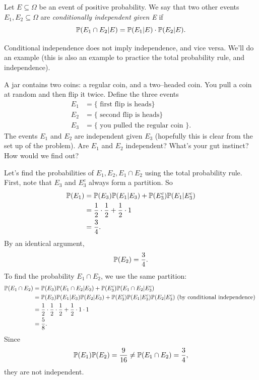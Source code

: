 \documentclass{ximera}
\begin{document}
\begin{definition}
Let $E\subseteq \Omega$ be an event of positive probability. We say that two other events $E_1,E_2\subseteq \Omega$ are \textit{conditionally independent given E} if
$$
\mathbb{P}(E_1 \cap E_2 \vert E) = \mathbb{P}(E_1\vert E) \cdot \mathbb{P}(E_2 \vert E).
$$
\end{definition}

Conditional independence does not imply independence, and vice versa. We'll do an example (this is also an example to practice the total probability rule, and independence).

A jar contains two coins: a regular coin, and a two--headed coin. You pull a coin at random and then flip it twice. Define the three events
\begin{align*}
E_1 &= \{ \text{ first flip is heads}\}\\
E_2 &= \{ \text{ second flip is heads}\}\\
E_3 &= \{ \text{ you pulled the regular coin }\}.
\end{align*}
The events $E_1$ and $E_2$ are independent given $E_3$ (hopefully this is clear from the set up of the problem). Are $E_1$ and $E_2$ independent? What's your gut instinct? How would we find out?

Let's find the probabilities of $E_1,E_2,E_1 \cap E_2$ using the total probability rule.  First, note that $E_3$ and $E_3^c$ always form a partition. So
\begin{align*}
\mathbb{P}(E_1) &= \mathbb{P}(E_3)\mathbb{P}(E_1 \vert E_3) + \mathbb{P}(E_3^c)\mathbb{P}(E_1 \vert E_3^c) \\
&= \frac{1}{2} \cdot \frac{1}{2} + \frac{1}{2} \cdot 1 \\
&= \frac{3}{4}.
\end{align*}
By an identical argument,
$$
\mathbb{P}(E_2) = \frac{3}{4}.
$$
To find the probability $E_1\cap E_2$, we use the same partition:
\begin{align*}
\mathbb{P}(E_1 \cap E_2) &= \mathbb{P}(E_3)\mathbb{P}(E_1 \cap E_2 \vert E_3) + \mathbb{P}(E_3^c)\mathbb{P}(E_1 \cap E_2 \vert E_3^c) \\
&=  \mathbb{P}(E_3)\mathbb{P}(E_1 \vert E_3) \mathbb{P}( E_2 \vert E_3) + \mathbb{P}(E_3^c)\mathbb{P}(E_1 \vert E_3^c) \mathbb{P}( E_2 \vert E_3^c) \text{  (by conditional independence) }\\
&= \frac{1}{2} \cdot \frac{1}{2} \cdot \frac{1}{2} + \frac{1}{2} \cdot 1 \cdot 1 \\
&= \frac{5}{8}.
\end{align*}
Since 
$$
\mathbb{P}(E_1)\mathbb{P}(E_2) = \frac{9}{16} \neq \mathbb{P}(E_1 \cap E_2) = \frac{3}{4},
$$
they are not independent.


\newpage
\end{document}
